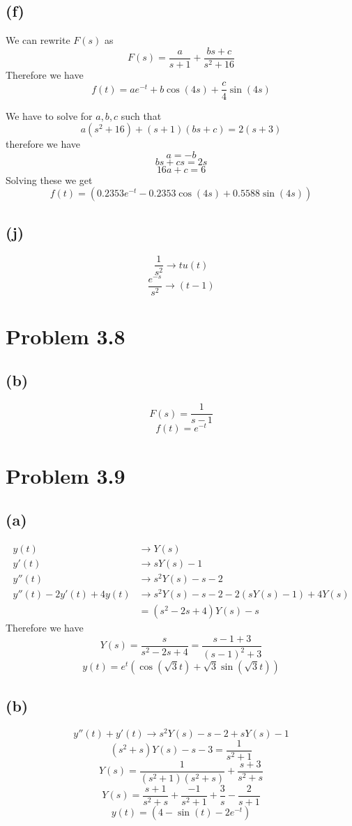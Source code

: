 \documentclass[12pt]{article}
\begin{document}
\subsection*{(f)}
We can rewrite $F(s)$ as
$$F(s)=\frac{a}{s+1}+\frac{bs+c}{s^2+16}$$
Therefore we have
$$f(t)=ae^{-t}+b\cos(4s)+\frac{c}{4}\sin(4s)$$


We have to solve for $a,b,c$ such that
$$a(s^2+16)+(s+1)(bs+c)=2(s+3)$$
therefore we have
$$a=-b$$
$$bs+cs=2s$$
$$16a+c=6$$
Solving these we get
$$f(t)=\boxed{\left(0.2353e^{-t}-0.2353\cos(4s)+0.5588\sin(4s)\right)}$$

\subsection*{(j)}
$$\frac{1}{s^2}\to tu(t)$$
$$\frac{e^{-s}}{s^2}\to \boxed{(t-1)}$$

\section*{Problem 3.8}
\subsection*{(b)}
$$F(s)=\frac{1}{s-1}$$
$$f(t)=e^{-t}$$
\section*{Problem 3.9}
\subsection*{(a)}
\begin{align*}
y(t)&\to Y(s)\\
y'(t)&\to sY(s)-1\\
y''(t)&\to s^2Y(s)-s-2\\
y''(t)-2y'(t)+4y(t)&\to s^2Y(s)-s-2-2(sY(s)-1)+4Y(s)\\
&=(s^2-2s+4)Y(s)-s
\end{align*}
Therefore we have
$$Y(s)=\frac{s}{s^2-2s+4}=\frac{s-1+3}{(s-1)^2+3}$$
$$y(t)=e^t (\cos(\sqrt{3}t)+\sqrt{3}\sin(\sqrt{3}t))$$

\subsection*{(b)}
$$y''(t)+y'(t)\to s^2Y(s)-s-2+sY(s)-1$$
$$(s^2+s)Y(s)-s-3=\frac{1}{s^2+1}$$
$$Y(s)=\frac{1}{(s^2+1)(s^2+s)}+\frac{s+3}{s^2+s}$$
$$Y(s)=\frac{s+1}{s^2+s}+\frac{-1}{s^2+1}+\frac{3}{s}-\frac{2}{s+1}$$
$$y(t)=\boxed{(4-\sin(t)-2e^{-t})}$$
\end{document}
